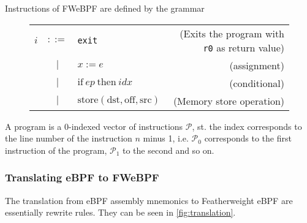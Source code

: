 Instructions of FWeBPF are defined by the grammar
\begin{figure}[H]
  \centering
  \begin{tabular}{lclr}
    $i$ & $::=$ & \texttt{exit} & (Exits the program with \texttt{r0} as return value) \\
        & $|$   & $x := e$      & (assignment) \\
        & $|$   & $\mathrm{if} ~ ep ~ \mathrm{then} ~ idx$ & (conditional) \\
& $|$ & $\mathrm{store(dst, off, src)}$ & (Memory store operation) \\
\end{tabular}    
\end{figure}



A program is a 0-indexed vector of instructions $\mathcal{P}$, st. the index corresponds to the line number of the instruction $n$ minus 1, i.e. $\mathcal{P}_0$ corresponds to the first instruction of the program, $\mathcal{P}_1$ to the second and so on.

\subsubsection{Translating eBPF to FWeBPF}
The translation from eBPF assembly mnemonics to Featherweight eBPF are essentially rewrite rules. They can be seen in \ref{fig:translation}.

